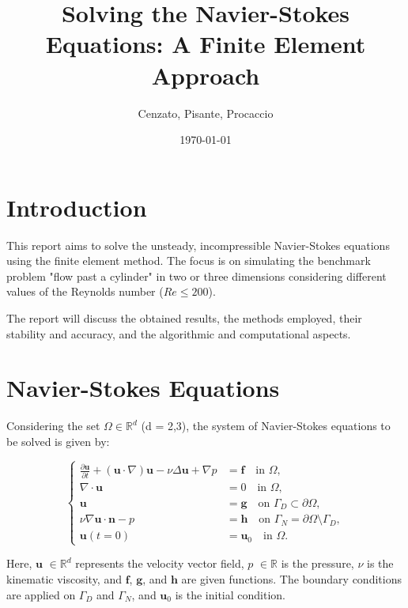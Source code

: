 \documentclass{article}
\title{Solving the Navier-Stokes Equations: A Finite Element Approach}
\author{Cenzato, Pisante, Procaccio}
\date{\today}
\begin{document}
\maketitle

\tableofcontents


\section*{Introduction}

This report aims to solve the unsteady, incompressible Navier-Stokes equations using the finite element method. The focus is on simulating the benchmark problem "flow past a cylinder" in two or three dimensions considering different values of the Reynolds number (\(Re \leq 200\)).



The report will discuss the obtained results, the methods employed, their stability and accuracy, and the algorithmic and computational aspects.

\section*{Navier-Stokes Equations}

Considering the set $\Omega \in \mathbb{R}^d$ (d = 2,3), the system of Navier-Stokes equations to be solved is given by:

\begin{equation}
\begin{cases}
\frac{\partial \mathbf{u}}{\partial t} + (\mathbf{u} \cdot \nabla)\mathbf{u} - \nu \Delta \mathbf{u} + \nabla p &= \mathbf{f} \quad \text{in } \Omega , \\
\nabla \cdot \mathbf{u} &= 0 \quad \text{in } \Omega, \\
\mathbf{u} &= \mathbf{g} \quad \text{on } \Gamma_D \subset \partial \Omega, \\
\nu \nabla \mathbf{u} \cdot \mathbf{n} - p &= \mathbf{h} \quad \text{on } \Gamma_N = \partial \Omega \setminus \Gamma_D, \\
\mathbf{u}(t = 0) &= \mathbf{u}_0 \quad \text{in } \Omega.
\end{cases}
\end{equation}

Here, \(\mathbf{u}\) $\in \mathbb{R}^d$ represents the velocity vector field, \(p\) $\in \mathbb{R}$ is the pressure, \(\nu\) is the kinematic viscosity, and \(\mathbf{f}\), \(\mathbf{g}\), and \(\mathbf{h}\) are given functions. The boundary conditions are applied on \(\Gamma_D\) and \(\Gamma_N\), and \(\mathbf{u}_0\) is the initial condition.
\end{document}
